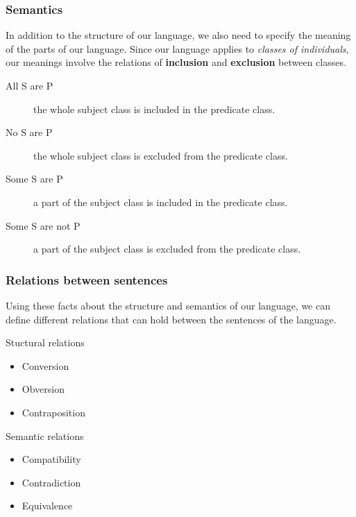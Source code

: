 \documentclass[10pt,letterpaper,xcolor=dvipsnames,handout]{beamer}
\begin{document}
\begin{frame}
  \frametitle{Semantics}
  
  In addition to the structure of our language, we also need to specify the meaning of the parts of our language.  Since our language applies to \textit{classes of individuals}, our meanings involve the relations of \textbf{inclusion} and \textbf{exclusion} between classes. 
  
  \begin{description}
    \item[All S are P] the whole subject class is included in the predicate class.
    \item[No S are P] the whole subject class is excluded from the predicate class.
    \item[Some S are P] a part of the subject class is included in the predicate class.
    \item[Some S are not P] a part of the subject class is excluded from the predicate class. 
  \end{description}

\end{frame}

\begin{frame}
  \frametitle{Relations between sentences}
  
  Using these facts about the structure and semantics of our language, we can define different relations that can hold between the sentences of the language.
  
  \begin{block}{Stuctural relations}
    \begin{itemize}
      \item Conversion
      \item Obversion
      \item Contraposition
    \end{itemize}
  \end{block}
  
  \begin{block}{Semantic relations}
    \begin{itemize}
      \item Compatibility
      \item Contradiction
      \item Equivalence
    \end{itemize}
  \end{block}
\end{frame}
\end{document}
